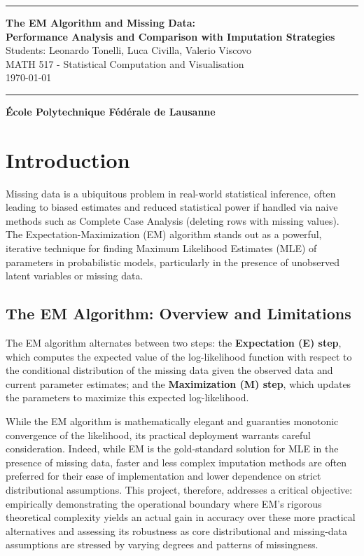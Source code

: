 \documentclass{article}
\begin{document}
\begin{titlepage}
\centering
\vspace*{4cm}
\rule{\textwidth}{1pt}\vspace{0.2cm}

{\LARGE\bfseries The EM Algorithm and Missing Data:\\[0.2cm] 
Performance Analysis and Comparison with Imputation Strategies}\\[0.3cm]
{\Large Students: Leonardo Tonelli, Luca Civilla, Valerio Viscovo}\\[0.2cm]
{\Large MATH 517 - Statistical Computation and Visualisation}\\[0.3cm]
{\large \today}\\[0.2cm]

\rule{\textwidth}{1pt}
\vfill
{\large \textbf{École Polytechnique Fédérale de Lausanne}}
\end{titlepage}

\section{Introduction}

Missing data is a ubiquitous problem in real-world statistical inference, often leading to biased estimates and reduced statistical power if handled via naive methods such as Complete Case Analysis (deleting rows with missing values). The Expectation-Maximization (EM) algorithm stands out as a powerful, iterative technique for finding Maximum Likelihood Estimates (MLE) of parameters in probabilistic models, particularly in the presence of unobserved latent variables or missing data.

\subsection{The EM Algorithm: Overview and Limitations}
The EM algorithm alternates between two steps: the \textbf{Expectation (E) step}, which computes the expected value of the log-likelihood function with respect to the conditional distribution of the missing data given the observed data and current parameter estimates; and the \textbf{Maximization (M) step}, which updates the parameters to maximize this expected log-likelihood.

While the EM algorithm is mathematically elegant and guaranties monotonic convergence of the likelihood, its practical deployment warrants careful consideration. Indeed, while EM is the gold-standard solution for MLE in the presence of missing data, faster and less complex imputation methods are often preferred for their ease of implementation and lower dependence on strict distributional assumptions. This project, therefore, addresses a critical objective: empirically demonstrating the operational boundary where EM's rigorous theoretical complexity yields an actual gain in accuracy over these more practical alternatives and assessing its robustness as core distributional and missing-data assumptions are stressed by varying degrees and patterns of missingness.
\end{document}
